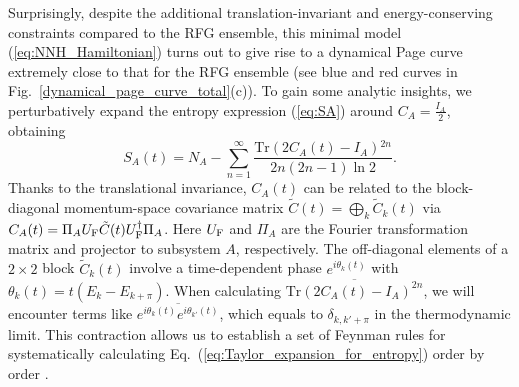 \documentclass[twocolumn,english,prl,aps,superscriptaddress,amsmath,amssymb,floatfix]{revtex4-2}
\begin{document}
Surprisingly, despite the additional translation-invariant and energy-conserving constraints compared to the RFG ensemble, this minimal model (\ref{eq:NNH_Hamiltonian}) turns out to give rise to %
a dynamical Page curve extremely close to that for the %
RFG ensemble %
(see blue and red curves in Fig.~\ref{dynamical_page_curve_total}(c)). 
To gain some analytic insights, we perturbatively expand %
the entropy expression (\ref{eq:SA}) %
around $C_{A}=\frac{I_{A}}{2}$, obtaining %
\begin{equation}
S_{A}(t)=N_{A}-%
\sum_{n=1}^{\infty}\frac{\mathrm{Tr}(2C_{A}(t)-I_{A}){}^{2n}}{2n(2n-1)\ln2}.
\label{eq:Taylor_expansion_for_entropy}
\end{equation}
Thanks to the translational invariance, $C_{A}(t)$ can be related to the block-diagonal momentum-space covariance matrix $\tilde C(t)=\bigoplus_k\tilde C_k(t)$ via %
$C_{A}(t)=\Pi_{A}U_{\rm F}\tilde{C}(t)U^{\dagger}_{\rm F}\Pi_{A}$. Here
$U_{\rm F}$ and $\Pi_{A}$ are the Fourier transformation matrix and projector %
to subsystem $A$, respectively. %
The off-diagonal
elements of a $2\times2$ block $\tilde{C}_k(t)$ involve %
a time-dependent %
phase
$e^{i\theta_{k}(t)}$ with %
$\theta_{k}(t)=t(E_{k}-E_{k+\pi})$.
When calculating $\overline{\mathrm{Tr}(2C_{A}(t)-I_{A})^{2n}}$, 
we will encounter %
terms like $\overline{e^{i\theta_{k}(t)}e^{i\theta_{k'}(t)}}$,
which equals to $\delta_{k,k'+\pi}$ in the thermodynamic limit.
This contraction allows us to establish a set of Feynman rules for %
systematically calculating Eq.~(\ref{eq:Taylor_expansion_for_entropy})
order by order \cite{SM}. %
\end{document}

